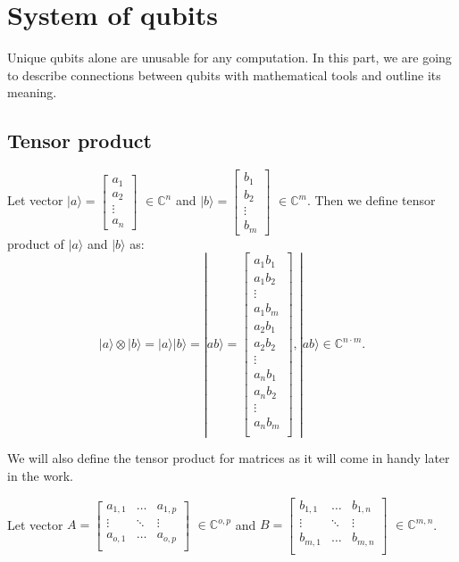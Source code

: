 \section{System of qubits}

Unique qubits alone are unusable for any computation. In this part, we are going to describe connections between qubits with mathematical tools and outline its meaning.

\subsection{Tensor product}
 Let vector $ |a\rangle =
%
%
\begin{bmatrix}
     a_1\\
     a_2\\
     \vdots\\
     a_n
\end{bmatrix}$ 
%
%
$\in \mathbb{C}^n $ and 
%
%
$ |b\rangle =
\begin{bmatrix}
     b_1\\
     b_2\\
     \vdots\\
     b_m
\end{bmatrix}$ $\in \mathbb{C}^m$. 
Then we define tensor product of $|a\rangle$ and $|b\rangle$ as: 
\begin{equation}
|a\rangle \otimes |b\rangle = |a\rangle |b\rangle = |ab\rangle =\begin{bmatrix}
     a_1  b_1\\
     a_1  b_2\\
     \vdots\\
     a_1  b_m\\
     a_2  b_1\\
     a_2  b_2\\
     \vdots\\
     a_n  b_1\\
     a_n  b_2\\
     \vdots\\
     a_n  b_m\\
\end{bmatrix}
, |ab\rangle \in \mathbb{C}^{n \cdot m} .
\end{equation}

We will also define the tensor product for matrices as it will come in handy later in the work.


 Let vector $ A =
%
%
\begin{bmatrix}
     a_{1,1} &\hdots &a_{1,p} \\
     \vdots& \ddots & \vdots\\
     a_{o,1} &\hdots &a_{o,p}\\
\end{bmatrix}$ 
%
%
$\in \mathbb{C}^{o,p} $ and 
%
%
$ B =
\begin{bmatrix}
     b_{1,1}  &\hdots &b_{1,n} \\
     \vdots  & \ddots & \vdots\\
     b_{m,1} &\hdots &b_{m,n} \\
\end{bmatrix}$ $\in \mathbb{C}^{m,n}$. 

